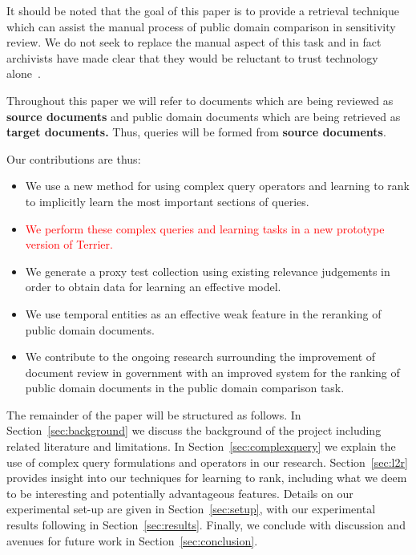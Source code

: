 \documentclass{mpaper}
\let\oldcite=\cite
\renewcommand\cite[1]{\ifthenelse{\equal{#1}{NEEDED}}{\ensuremath{^\texttt{[citation~needed]}}}{\oldcite{#1}}}
\newcommand{\remove}[1]{\textcolor{red}{#1}}
\begin{document}
It should be noted that the goal of this paper is to provide a retrieval technique which can assist the manual process of public domain comparison in sensitivity review.
We do not seek to replace the manual aspect of this task and in fact archivists have made clear that they would be reluctant to trust technology alone~\cite{gollins2014using}.

Throughout this paper we will refer to documents which are being reviewed as \textbf{source documents} and public domain documents which are being retrieved as \textbf{target documents.} Thus, queries will be formed from \textbf{source documents}.


Our contributions are thus:
\begin{itemize}
\item We use a  new method for using complex query operators and learning to rank to implicitly learn the most important sections of queries.
\item \remove{We perform these complex queries and learning tasks in a new prototype version of Terrier.}
\item We generate a proxy test collection using existing relevance judgements in order to obtain data for learning an effective model.
\item We use temporal entities as an effective weak feature in the reranking of public domain documents. %
\item We contribute to the ongoing research surrounding the improvement of document review in government with an improved system for the ranking of public domain documents in the public domain comparison task.
\end{itemize}

The remainder of the paper will be structured as follows.
In Section~\ref{sec:background} we discuss the background of the project including related literature and limitations.
In Section~\ref{sec:complexquery} we explain the use of complex query formulations and operators in our research.
Section~\ref{sec:l2r} provides insight into our techniques for learning to rank, including what we deem to be interesting and potentially advantageous features.
Details on our experimental set-up are given in Section~\ref{sec:setup}, with our experimental results following in Section~\ref{sec:results}.
Finally, we conclude with discussion and avenues for future work in Section~\ref{sec:conclusion}.
\end{document}
